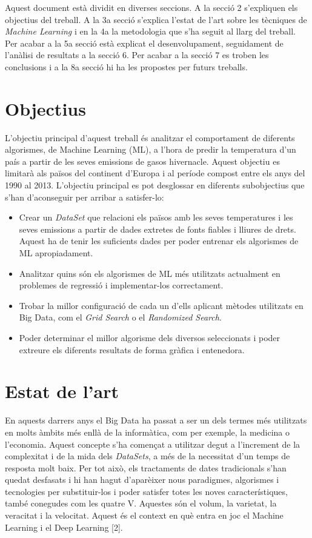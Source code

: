 \documentclass[10pt,a4paper,twocolumn,twoside]{article}
\begin{document}
Aquest document està dividit en diverses seccions. A la secció 2 s'expliquen els objectius del treball. A la 3a secció s'explica l'estat de l'art sobre les tècniques de \textit{Machine Learning} i en la 4a la metodologia que s'ha seguit al llarg del treball. Per acabar a la 5a secció està explicat el desenvolupament, seguidament de l'anàlisi de resultats a la secció 6. Per acabar a la secció 7 es troben les conclusions i a la 8a secció hi ha les propostes per futurs treballs.   
\section{Objectius}
L'objectiu principal d'aquest treball és analitzar el comportament de diferents algorismes, de Machine Learning (ML), a l'hora de predir la temperatura d'un país a partir de les seves emissions de gasos hivernacle. Aquest objectiu es limitarà als països del continent d'Europa i al període compost entre els anys del 1990 al 2013. L'objectiu principal es pot desglossar en diferents subobjectius que s'han d'aconseguir per arribar a satisfer-lo:
\begin{itemize}
\item Crear un \textit{DataSet} que relacioni els països amb les seves temperatures i les seves emissions a partir de dades extretes de fonts fiables i lliures de drets. Aquest ha de tenir les suficients dades per poder entrenar els algorismes de ML apropiadament.
\item Analitzar quins són els algorismes de ML més utilitzats actualment en problemes de regressió i implementar-los correctament.
\item Trobar la millor configuració de cada un d'ells aplicant mètodes utilitzats en Big Data, com el \textit{Grid Search} o el \textit{Randomized Search}.
\item Poder determinar el millor algorisme dels diversos seleccionats i poder extreure els diferents resultats de forma gràfica i entenedora.  
\end{itemize}
\section {Estat de l'art}
En aquests darrers anys el Big Data ha passat a ser un dels termes més utilitzats en molts àmbits més enllà de la informàtica, com per exemple, la medicina o l'economia. Aquest concepte s'ha començat a utilitzar degut a l'increment de la complexitat i de la mida dels \textit{DataSets}, a més de la necessitat d'un temps de resposta molt baix. Per tot això, els tractaments de dates tradicionals s'han quedat desfasats i hi han hagut d'aparèixer nous paradigmes, algorismes i tecnologies per substituir-los i poder satisfer totes les noves característiques, també conegudes com les quatre V. Aquestes són el volum, la varietat, la veracitat i la velocitat. Aquest és el context en què entra en joc el Machine Learning i el Deep Learning [2].
\end{document}
